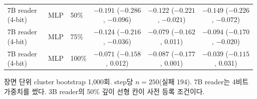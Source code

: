 \documentclass[11pt]{article}
\begin{document}
\begin{table}[h]
\begin{tabular}{@{}lllccc@{}}
7B reader (4-bit) & MLP & 50\% & $-0.191$ ($-0.286$, $-0.096$) & $-0.122$ ($-0.221$, $-0.021$) & $-0.149$ ($-0.226$, $-0.072$) \\
7B reader (4-bit) & MLP & 75\% & $-0.124$ ($-0.216$, $-0.036$) & $-0.079$ ($-0.162$, 0.011) & $-0.094$ ($-0.170$, $-0.020$) \\
7B reader (4-bit) & MLP & 100\% & $-0.071$ ($-0.158$, 0.012) & $-0.087$ ($-0.177$, 0.001) & $-0.039$ ($-0.115$, 0.031) \\
\bottomrule
\end{tabular}
\par\smallskip\raggedright\footnotesize
장면 단위 cluster bootstrap 1,000회. step당 $n = 250$(실패 194). 7B reader는 4비트 가중치를 썼다. 3B reader의 50\% 깊이 선형 칸이 사전 등록 조건이다.
\end{table}
\end{document}

